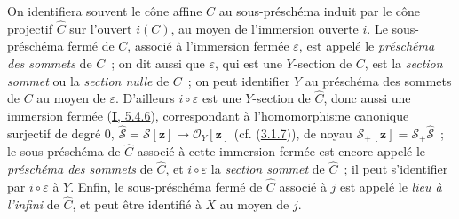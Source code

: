 \begin{env}[8.3.3]
\label{II.8.3.3-fr}
On identifiera souvent le cône affine $C$ au sous-préschéma induit par le cône
projectif $\widehat{C}$ sur l'ouvert $i(C)$, au moyen de l'immersion ouverte
$i$. Le sous-préschéma fermé de $C$, associé à l'immersion fermée
$\varepsilon$, est appelé le \emph{préschéma des sommets} de $C$~; on dit
aussi que $\varepsilon$, qui est une $Y$-section de $C$, est la \emph{section
sommet} ou la \emph{section nulle} de $C$~; on peut identifier $Y$ au
préschéma des sommets de $C$ au moyen de $\varepsilon$. D'ailleurs
$i\circ\varepsilon$ est une $Y$-section de $\widehat{C}$, donc aussi une
immersion fermée (\hyperref[I.5.4.6-fr]{\textbf{I}, 5.4.6}), correspondant à
l'homomorphisme canonique surjectif de degré $0$,
$\widehat{\mathcal{S}}=\mathcal{S}[\mathbf{z}]\to\mathcal{O}_Y[\mathbf{z}]$
(cf. (\hyperref[II.3.1.7-fr]{3.1.7})), de noyau
$\mathcal{S}_+[\mathbf{z}]=\mathcal{S}_+\widehat{\mathcal{S}}$~; le sous-préschéma de
$\widehat{C}$ associé à cette immersion fermée est encore appelé le
\emph{préschéma des sommets} de $\widehat{C}$, et $i\circ\varepsilon$ la
\emph{section sommet} de $\widehat{C}$~; il peut s'identifier par
$i\circ\varepsilon$ à $Y$. Enfin, le sous-préschéma fermé de $\widehat{C}$
associé à $j$ est appelé le \emph{lieu à l'infini} de $\widehat{C}$, et peut
être identifié à $X$ au moyen de $j$.
\end{env}

